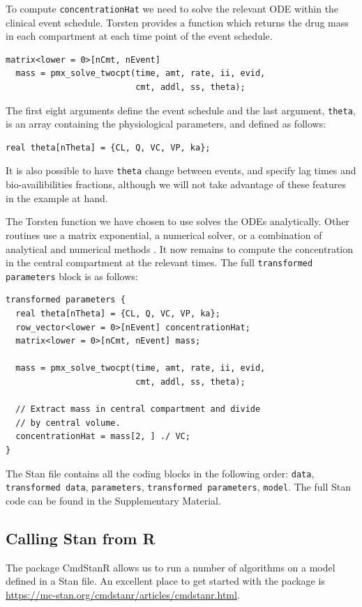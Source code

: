 To compute \texttt{concentrationHat} we need to solve the relevant ODE within the clinical event schedule.
Torsten provides a function which returns the drug mass in each compartment at each time point of the event schedule.
\begin{lstlisting}
matrix<lower = 0>[nCmt, nEvent] 
  mass = pmx_solve_twocpt(time, amt, rate, ii, evid,
                          cmt, addl, ss, theta);
\end{lstlisting}
%
The first eight arguments define the event schedule and the last argument, \texttt{theta}, is an array containing the physiological parameters, and defined as follows:
\begin{lstlisting}
real theta[nTheta] = {CL, Q, VC, VP, ka};
\end{lstlisting}
%
It is also possible to have \texttt{theta} change between events, and specify lag times and bio-availibilities fractions, although we will not take advantage of these features in the example at hand.

The Torsten function we have chosen to use solves the ODEs analytically.
Other routines use a matrix exponential, a numerical solver, or a combination of analytical and numerical methods \cite{Margossian:2017}.
It now remains to compute the concentration in the central compartment at the relevant times.
The full \texttt{transformed parameters} block is as follows:
\begin{lstlisting}
transformed parameters {
  real theta[nTheta] = {CL, Q, VC, VP, ka};
  row_vector<lower = 0>[nEvent] concentrationHat;
  matrix<lower = 0>[nCmt, nEvent] mass;

  mass = pmx_solve_twocpt(time, amt, rate, ii, evid, 
                          cmt, addl, ss, theta);

  // Extract mass in central compartment and divide 
  // by central volume.
  concentrationHat = mass[2, ] ./ VC;
}  
\end{lstlisting} 

The Stan file contains all the coding blocks in the following order: \texttt{data}, \texttt{transformed data}, \texttt{parameters}, \texttt{transformed parameters}, \texttt{model}.
The full Stan code can be found in the Supplementary Material.

\subsection{Calling Stan from R}\label{sec:call_stan_from_R}
The package CmdStanR allows us to run a number of algorithms on a model defined in a Stan file.
An excellent place to get started with the package is \url{https://mc-stan.org/cmdstanr/articles/cmdstanr.html}.

